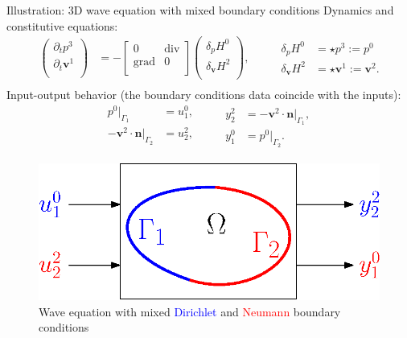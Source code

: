 \documentclass[aspectratio=169]{beamer}
\DeclareMathOperator*{\grad}{grad}
\renewcommand{\div}{\operatorname{div}}
\begin{document}
\begin{frame}{Illustration: 3D wave equation with mixed boundary conditions}
	Dynamics and constitutive equations:
\begin{equation*}
	\begin{aligned}
		\begin{pmatrix}
			\partial_t p^3 \\
			\partial_t \bm{v}^1\\
		\end{pmatrix} &= 
		-\begin{bmatrix}
			0 & \div \\
			\grad & 0 \\
		\end{bmatrix}
		\begin{pmatrix}
			\delta_{p} H^{0}\\
			\delta_{\bm{v}} H^{2}\\
		\end{pmatrix}, \\
	\end{aligned}	\qquad
\begin{aligned}
	\delta_{p} H^{0} &= \star p^3 := p^0\\
	\delta_{\bm{v}} H^{2} &= \star \bm{v}^1:= \bm{v}^2. \\
\end{aligned}
\end{equation*}
Input-output behavior (the boundary conditions data coincide with the inputs):
\begin{equation*}
	\begin{aligned}
		p^0|_{\Gamma_1} &= u^0_1, \\
	-\bm{v}^2\cdot \bm{n}|_{\Gamma_2}  &= u^{2}_2, \\
	\end{aligned}	\qquad
	\begin{aligned}
		y^2_2 &= -\bm{v}^2\cdot \bm{n}|_{\Gamma_1}, \\
		y^{0}_1 &= p^0|_{\Gamma_2}.
	\end{aligned}
\end{equation*}

\begin{figure}
\centering
\includegraphics[width=.5\textwidth]{bound_part.eps}
\caption*{Wave equation with mixed \textcolor{blue}{Dirichlet} and \textcolor{red}{Neumann} boundary conditions}
\end{figure}

\end{frame}	
\end{document}
